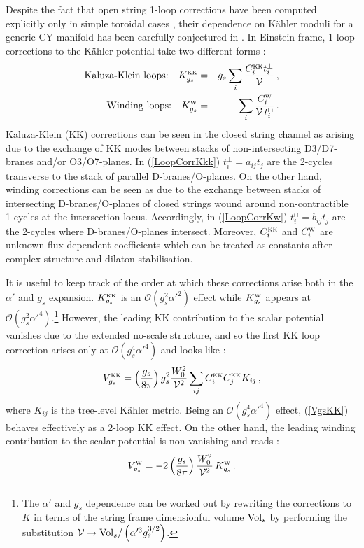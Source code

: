 \documentclass[11pt,a4paper]{article}
\newcommand{\bea}{\begin{eqnarray}}
\newcommand{\eea}{\end{eqnarray}}
\newcommand{\be}{\begin{equation}}
\newcommand{\ee}{\end{equation}}
\def\KK{{\scriptscriptstyle \rm KK}}
\def\W{{\scriptscriptstyle \rm W}}
\newcommand\vo{{\mathcal{V}}}
\newcommand{\mc}{\mathcal}
\begin{document}
Despite the fact that open string 1-loop corrections have been computed explicitly only in simple toroidal cases \cite{Berg:2005ja}, their dependence on K\"ahler moduli for a generic CY manifold has been carefully conjectured in \cite{Berg:2007wt}. In Einstein frame, 1-loop corrections to the K\"ahler potential take two different forms \cite{Berg:2007wt}:
\bea
\text{Kaluza-Klein loops:} \quad K^\KK_{g_s} &=& g_s \sum_i \frac{C_i^\KK t_i^{\perp}}{\vo} \,, 
\label{LoopCorrKkk} \\
\text{Winding loops:} \quad K^\W_{g_s} &=& \sum_i \frac{C_i^\W}{\vo\, t_i^{\cap}}\,.
\label{LoopCorrKw}
\eea
Kaluza-Klein (KK) corrections can be seen in the closed string channel as arising due to the exchange of KK modes between stacks of non-intersecting D3/D7-branes and/or O3/O7-planes. In (\ref{LoopCorrKkk}) $t_i^\perp = a_{ij} t_j$ are the 2-cycles transverse to the stack of parallel D-branes/O-planes. On the other hand, winding corrections can be seen as due to the exchange between stacks of intersecting D-branes/O-planes of closed strings wound around non-contractible 1-cycles at the intersection locus. Accordingly, in (\ref{LoopCorrKw}) $t_i^{\cap} = b_{ij} t_j$ are the 2-cycles where D-branes/O-planes intersect. Moreover, $C_i^\KK$ and $C_i^\W$ are unknown flux-dependent coefficients which can be treated as constants after complex structure and dilaton stabilisation.
 
It is useful to keep track of the order at which these corrections arise both in the $\alpha'$ and $g_s$ expansion. $K_{g_s}^\KK$ is an $\mc{O}\left(g_s^2 \alpha'^2\right)$ effect while $K^\W_{g_s}$ appears at $\mc{O}\left(g_s^2 \alpha'^4\right)$.\footnote{The $\alpha'$ and $g_s$ dependence can be worked out by rewriting the corrections to $K$ in terms of the string frame dimensionful volume ${\rm Vol}_s$ by performing the substitution $\vo \rightarrow {\rm Vol}_s/\left(\alpha'^3 g_s^{3/2}\right)$.} However, the leading KK contribution to the scalar potential vanishes due to the extended no-scale structure, and so the first KK loop correction arises only at $\mc{O}\left(g_s^4 \alpha'^4\right)$ and looks like \cite{Cicoli:2007xp}:
\be
V_{g_s}^\KK = \left(\frac{g_s}{8 \pi}\right) g_s^2 \frac{W_0^2}{\vo^2} \sum_{ij} C_i^\KK C_j^\KK K_{ij} \,,
\label{VgsKK}
\ee 
where $K_{ij}$ is the tree-level K\"ahler metric. Being an $\mc{O}\left(g_s^4 \alpha'^4\right)$ effect, (\ref{VgsKK}) behaves effectively as a 2-loop KK effect. On the other hand, the leading winding contribution to the scalar potential is non-vanishing and reads \cite{Cicoli:2007xp}:
\be
V_{g_s}^\W = -2 \left(\frac{g_s}{8 \pi}\right) \frac{W_0^2}{\vo^2} \, K_{g_s}^\W \,.
\label{VgsW}
\ee
\end{document}
